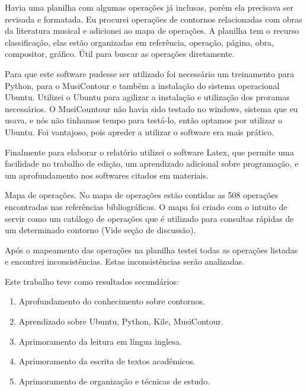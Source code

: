 \documentclass[11pt]{article}
\begin{document}
Havia uma planilha com algumas operações já inclusas, porém ela
precisava ser revisada e formatada.  Eu procurei operações de
contornos relacionadas com obras da literatura musical e adicionei ao
mapa de operações.
A planilha tem o recurso classificação, elas estão organizadas em
referência, operação, página, obra, compositor, gráfico. Útil para buscar as
operações diretamente.

Para que este software pudesse ser utilizado foi necessário um
treinamento para Python, para o MusiContour e também a instalação do
sistema operacional Ubuntu. Utilizei o Ubuntu para agilizar a
instalação e utilização dos proramas necessários. O MusiCountour não
havia sido testado no windows, sistema que eu usava, e nós não
tinhamos tempo para testá-lo, então optamos por utilizar o Ubuntu. Foi
vantajoso, pois apreder a utilizar o software era mais prático.

Finalmente para elaborar o relatório utilizei o software Latex, que
permite uma facilidade no trabalho de edição, um aprendizado adicional
sobre programação, e um aprofundamento nos softwares citados em
materiais.

\label{sec:resultados}


Mapa de operações. No mapa de operações estão contidas as 508 operações
encontradas nas referências bibliográficas. O mapa foi criado com o intuito de
servir como um catálogo de operações que é utilizado para consultas rápidas
de um determinado contorno (Vide seção de discussão).

Após o mapeamento das operações na planilha testei todas as operações
listadas e encontrei inconsistências. Estas inconsistências serão analizadas.	

Este trabalho teve como resultados secundários:

\begin{enumerate}
\item Aprofundamento do conhecimento sobre contornos.
\item Aprendizado sobre Ubuntu, Python, Kile, MusiContour.
\item Aprimoramento da leitura em língua inglesa.
\item Aprimoramento da escrita de textos acadêmicos.
\item Aprimoramento de organização e técnicas de estudo.
\end{enumerate}
\end{document}
